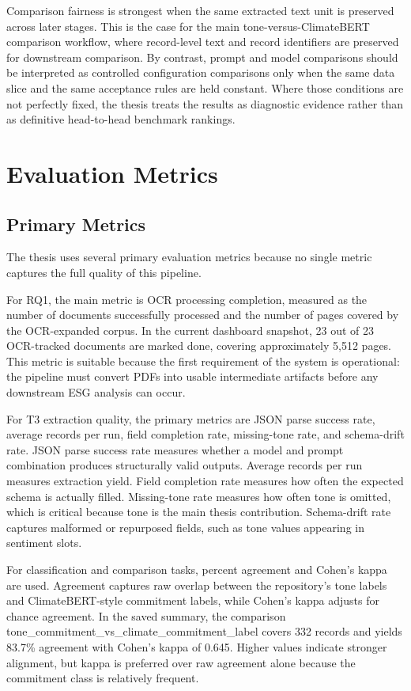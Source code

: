 Comparison fairness is strongest when the same extracted text unit is preserved across later stages. This is the case for the main tone-versus-ClimateBERT comparison workflow, where record-level text and record identifiers are preserved for downstream comparison. By contrast, prompt and model comparisons should be interpreted as controlled configuration comparisons only when the same data slice and the same acceptance rules are held constant. Where those conditions are not perfectly fixed, the thesis treats the results as diagnostic evidence rather than as definitive head-to-head benchmark rankings.

\section{Evaluation Metrics}

\subsection{Primary Metrics}

The thesis uses several primary evaluation metrics because no single metric captures the full quality of this pipeline.

For RQ1, the main metric is OCR processing completion, measured as the number of documents successfully processed and the number of pages covered by the OCR-expanded corpus. In the current dashboard snapshot, 23 out of 23 OCR-tracked documents are marked done, covering approximately 5,512 pages. This metric is suitable because the first requirement of the system is operational: the pipeline must convert PDFs into usable intermediate artifacts before any downstream ESG analysis can occur.

For T3 extraction quality, the primary metrics are JSON parse success rate, average records per run, field completion rate, missing-tone rate, and schema-drift rate. JSON parse success rate measures whether a model and prompt combination produces structurally valid outputs. Average records per run measures extraction yield. Field completion rate measures how often the expected schema is actually filled. Missing-tone rate measures how often tone is omitted, which is critical because tone is the main thesis contribution. Schema-drift rate captures malformed or repurposed fields, such as tone values appearing in sentiment slots.

For classification and comparison tasks, percent agreement and Cohen’s kappa are used. Agreement captures raw overlap between the repository’s tone labels and ClimateBERT-style commitment labels, while Cohen’s kappa adjusts for chance agreement. In the saved summary, the comparison tone\_commitment\_vs\_climate\_commitment\_label covers 332 records and yields 83.7\% agreement with Cohen’s kappa of 0.645. Higher values indicate stronger alignment, but kappa is preferred over raw agreement alone because the commitment class is relatively frequent.

